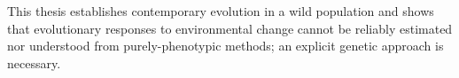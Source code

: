 \begin{summary}
This thesis establishes contemporary evolution in a wild population and shows that evolutionary responses to environmental change cannot be reliably estimated nor understood from purely-phenotypic methods; an explicit genetic approach is necessary. 

\end{summary}
